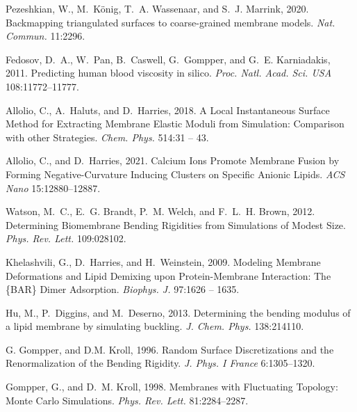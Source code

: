 \documentclass[twocolumn]{biophys-new}
\begin{document}
\begin{thebibliography}{52}
Pezeshkian, W., M.~K\"{o}nig, T.~A. Wassenaar, and S.~J. Marrink, 2020.
\newblock Backmapping triangulated surfaces to coarse-grained membrane models.
\newblock \emph{Nat. Commun.} 11:2296.

Fedosov, D.~A., W.~Pan, B.~Caswell, G.~Gompper, and G.~E. Karniadakis, 2011.
\newblock Predicting human blood viscosity in silico.
\newblock \emph{Proc. Natl. Acad. Sci. USA} 108:11772--11777.

Allolio, C., A.~Haluts, and D.~Harries, 2018.
\newblock A Local Instantaneous Surface Method for Extracting Membrane Elastic
  Moduli from Simulation: Comparison with other Strategies.
\newblock \emph{Chem. Phys.} 514:31 -- 43.

Allolio, C., and D.~Harries, 2021.
\newblock Calcium Ions Promote Membrane Fusion by Forming Negative-Curvature
  Inducing Clusters on Specific Anionic Lipids.
\newblock \emph{ACS Nano} 15:12880--12887.

Watson, M.~C., E.~G. Brandt, P.~M. Welch, and F.~L.~H. Brown, 2012.
\newblock Determining Biomembrane Bending Rigidities from Simulations of Modest
  Size.
\newblock \emph{Phys. Rev. Lett.} 109:028102.

Khelashvili, G., D.~Harries, and H.~Weinstein, 2009.
\newblock Modeling Membrane Deformations and Lipid Demixing upon
  Protein-Membrane Interaction: The \{BAR\} Dimer Adsorption.
\newblock \emph{Biophys. J.} 97:1626 -- 1635.

Hu, M., P.~Diggins, and M.~Deserno, 2013.
\newblock Determining the bending modulus of a lipid membrane by simulating
  buckling.
\newblock \emph{J. Chem. Phys.} 138:214110.

{G. Gompper}, and {D.M. Kroll}, 1996.
\newblock Random Surface Discretizations and the Renormalization of the Bending
  Rigidity.
\newblock \emph{J. Phys. I France} 6:1305--1320.

Gompper, G., and D.~M. Kroll, 1998.
\newblock Membranes with Fluctuating Topology: Monte Carlo Simulations.
\newblock \emph{Phys. Rev. Lett.} 81:2284--2287.


\end{thebibliography}
\end{document}
